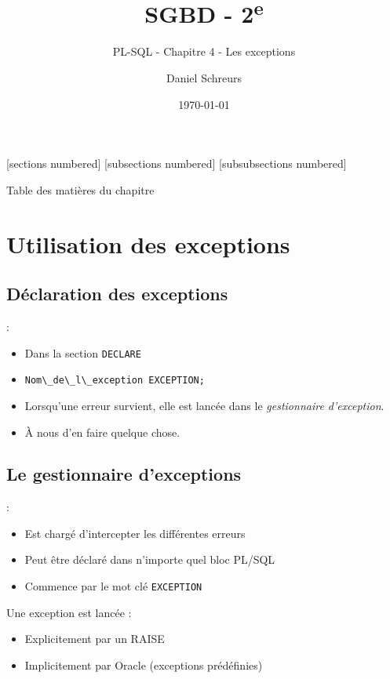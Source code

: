 \documentclass[10pt]{beamer}
\title{SGBD - 2\textsuperscript{e}}
\subtitle{PL-SQL - Chapitre 4 - Les exceptions}
\date{\today}
\author{Daniel Schreurs}
\institute{Haute École de Province de Liège}
\begin{document}
\maketitle

[sections numbered]
[subsections numbered]
[subsubsections numbered]
\begin{frame}[allowframebreaks]{Table des matières du chapitre}
    \tableofcontents[subsectionstyle=show/show/hide,subsubsectionstyle=show/show/hide,]
\end{frame}

\section{Utilisation des exceptions}
\tocss
\subsection{Déclaration des exceptions}
\begin{frame}{\secname : \subsecname}
    \begin{itemize}
        \item Dans la section \lstinline[language=plsql]!DECLARE!
        \item \lstinline[language=plsql]!Nom\_de\_l\_exception EXCEPTION;!
        \item Lorsqu'une erreur survient, elle est lancée dans le \emph{gestionnaire d'exception}.
        \item À nous d'en faire quelque chose.
    \end{itemize}
\end{frame}

\subsection{Le gestionnaire d'exceptions}
\begin{frame}{\secname : \subsecname}
    \begin{itemize}
        \item Est chargé d'intercepter les différentes erreurs
        \item Peut être déclaré dans n'importe quel bloc PL/SQL
        \item Commence par le mot clé \lstinline[language=plsql]!EXCEPTION!
    \end{itemize}
    Une exception est lancée :
    \begin{itemize}
        \item Explicitement par un RAISE
        \item Implicitement par Oracle (exceptions prédéfinies)
    \end{itemize}
\end{frame}
\end{document}
